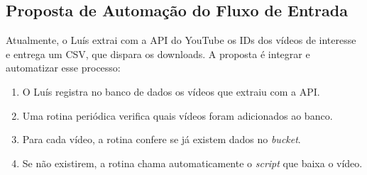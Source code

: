\documentclass[12pt, a4paper]{article}
\begin{document}
\subsection{Proposta de Automação do Fluxo de Entrada}
Atualmente, o Luís extrai com a API do YouTube os IDs dos vídeos de interesse e entrega um CSV, que dispara os downloads. A proposta é integrar e automatizar esse processo:
\begin{enumerate}[leftmargin=*]
    \item O Luís registra no banco de dados os vídeos que extraiu com a API.
    \item Uma rotina periódica verifica quais vídeos foram adicionados ao banco.
    \item Para cada vídeo, a rotina confere se já existem dados no \textit{bucket}.
    \item Se não existirem, a rotina chama automaticamente o \textit{script} que baixa o vídeo.
\end{enumerate}
\end{document}
